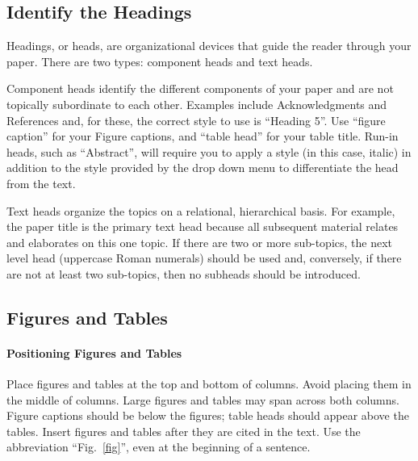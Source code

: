 \documentclass[conference]{IEEEtran}
\begin{document}
\subsection{Identify the Headings}
Headings, or heads, are organizational devices that guide the reader through 
your paper. There are two types: component heads and text heads.

Component heads identify the different components of your paper and are not 
topically subordinate to each other. Examples include Acknowledgments and 
References and, for these, the correct style to use is ``Heading 5''. Use 
``figure caption'' for your Figure captions, and ``table head'' for your 
table title. Run-in heads, such as ``Abstract'', will require you to apply a 
style (in this case, italic) in addition to the style provided by the drop 
down menu to differentiate the head from the text.

Text heads organize the topics on a relational, hierarchical basis. For 
example, the paper title is the primary text head because all subsequent 
material relates and elaborates on this one topic. If there are two or more 
sub-topics, the next level head (uppercase Roman numerals) should be used 
and, conversely, if there are not at least two sub-topics, then no subheads 
should be introduced.

\subsection{Figures and Tables}
\paragraph{Positioning Figures and Tables} Place figures and tables at the top and 
bottom of columns. Avoid placing them in the middle of columns. Large 
figures and tables may span across both columns. Figure captions should be 
below the figures; table heads should appear above the tables. Insert 
figures and tables after they are cited in the text. Use the abbreviation 
``Fig.~\ref{fig}'', even at the beginning of a sentence.
\end{document}
